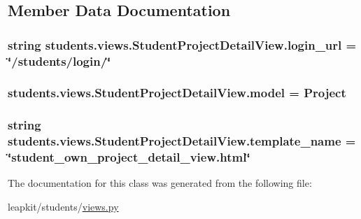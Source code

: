 \subsection{Member Data Documentation}
\hypertarget{classstudents_1_1views_1_1_student_project_detail_view_aa703710c9bb127a1d2ac4e279e329f69}{
\subsubsection[{login\-\_\-url}]{\setlength{\rightskip}{0pt plus 5cm}string students.\-views.\-Student\-Project\-Detail\-View.\-login\-\_\-url = \char`\"{}/students/login/\char`\"{}\hspace{0.3cm}{\ttfamily [static]}}}\label{classstudents_1_1views_1_1_student_project_detail_view_aa703710c9bb127a1d2ac4e279e329f69}
\hypertarget{classstudents_1_1views_1_1_student_project_detail_view_a787cda8d76de994a180a8dda8f10e124}{
\subsubsection[{model}]{\setlength{\rightskip}{0pt plus 5cm}students.\-views.\-Student\-Project\-Detail\-View.\-model = Project\hspace{0.3cm}{\ttfamily [static]}}}\label{classstudents_1_1views_1_1_student_project_detail_view_a787cda8d76de994a180a8dda8f10e124}
\hypertarget{classstudents_1_1views_1_1_student_project_detail_view_a58ec5230c2c0d52ad42510d59e0d647e}{
\subsubsection[{template\-\_\-name}]{\setlength{\rightskip}{0pt plus 5cm}string students.\-views.\-Student\-Project\-Detail\-View.\-template\-\_\-name = \char`\"{}student\-\_\-own\-\_\-project\-\_\-detail\-\_\-view.\-html\char`\"{}\hspace{0.3cm}{\ttfamily [static]}}}\label{classstudents_1_1views_1_1_student_project_detail_view_a58ec5230c2c0d52ad42510d59e0d647e}


The documentation for this class was generated from the following file\-:\begin{DoxyCompactItemize}
\item 
leapkit/students/\hyperlink{views_8py}{views.\-py}\end{DoxyCompactItemize}
